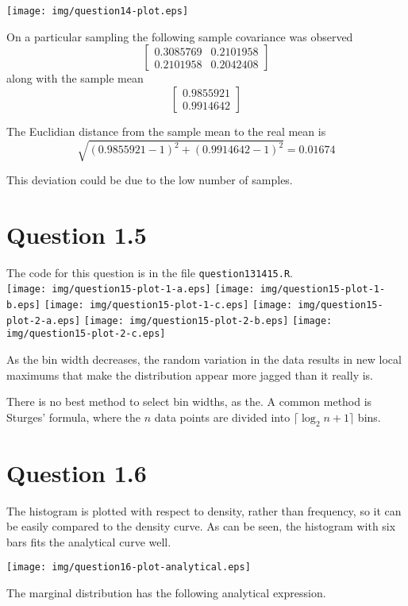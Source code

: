 \texttt{[image: img/question14-plot.eps]}

On a particular sampling the following sample covariance was observed
\[
\left[\begin{matrix}0.3085769&0.2101958\\0.2101958&0.2042408\end{matrix}\right]
\]
along with the sample mean
\[
\left[\begin{matrix}0.9855921\\0.9914642\end{matrix}\right]
\]

The Euclidian distance from the sample mean to the real mean is
\[
\sqrt{(0.9855921-1)^2+(0.9914642-1)^2}=0.01674
\]

This deviation could be due to the low number of samples.

\section*{Question 1.5}

The code for this question is in the file \texttt{question131415.R}.\\
\texttt{[image: img/question15-plot-1-a.eps]}
\texttt{[image: img/question15-plot-1-b.eps]}
\texttt{[image: img/question15-plot-1-c.eps]}
\texttt{[image: img/question15-plot-2-a.eps]}
\texttt{[image: img/question15-plot-2-b.eps]}
\texttt{[image: img/question15-plot-2-c.eps]}

As the bin width decreases, the random variation in the data results
in new local maximums that make the distribution appear more jagged
than it really is.

There is no best method to select bin widths, as the.  A common
method is Sturges' formula, where the $n$ data points are divided into
$\lceil\log_2n+1 \rceil$ bins.

\section*{Question 1.6}

The histogram is plotted with respect to density, rather than
frequency, so it can be easily compared to the density curve.  As can
be seen, the histogram with six bars fits the analytical curve well.

\texttt{[image: img/question16-plot-analytical.eps]}

The marginal distribution has the following analytical expression.

